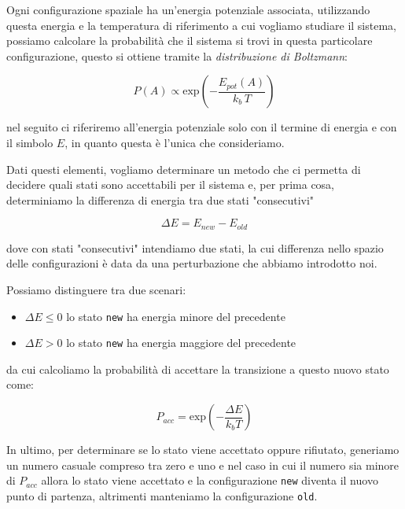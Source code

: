 \documentclass[a4paper,11pt,openany]{book}
\begin{document}
Ogni configurazione spaziale ha un'energia potenziale associata, utilizzando questa energia e la temperatura di riferimento a cui vogliamo studiare il sistema, possiamo calcolare la probabilità che il sistema si trovi in questa particolare configurazione, questo si ottiene tramite la \textit{distribuzione di Boltzmann}:

\begin{equation}
    P(A) \propto \mathrm{exp}\left(-\frac{E_{pot}(A)}{k_b\,T}\right)
\end{equation}

nel seguito ci riferiremo all'energia potenziale solo con il termine di energia e con il simbolo $E$, in quanto questa è l'unica che consideriamo.

Dati questi elementi, vogliamo determinare un metodo che ci permetta di decidere quali stati sono accettabili per il sistema e, per prima cosa, determiniamo la differenza di energia tra due stati "consecutivi"

\begin{equation}
    \Delta E = E_{new} - E_{old}
\end{equation}

dove con stati "consecutivi" intendiamo due stati, la cui differenza nello spazio delle configurazioni è data da una perturbazione che abbiamo introdotto noi.

Possiamo distinguere tra due scenari:

\begin{itemize}
    \item $\Delta E \leq 0$ lo stato \texttt{new} ha energia minore del precedente
    \item $\Delta E > 0$ lo stato \texttt{new} ha energia maggiore del precedente
\end{itemize}

da cui calcoliamo la probabilità di accettare la transizione a questo nuovo stato come:

\begin{equation}
    P_{acc} = \mathrm{exp}\left(-\frac{\Delta E}{k_bT} \right)
\end{equation}

In ultimo, per determinare se lo stato viene accettato oppure rifiutato, generiamo un numero casuale compreso tra zero e uno e nel caso in cui il numero sia minore di $P_{acc}$ allora lo stato viene accettato e la configurazione \texttt{new} diventa il nuovo punto di partenza, altrimenti manteniamo la configurazione \texttt{old}.
\end{document}
